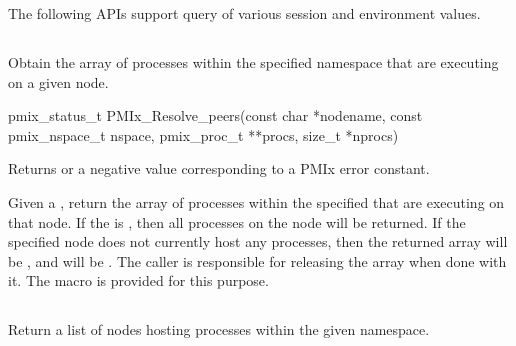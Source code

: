 The following \acp{API} support query of various session and environment values.

\subsection{}

\summary

Obtain the array of processes within the specified namespace that are executing on a given node.

\format

\cspecificstart
\begin{codepar}
pmix_status_t
PMIx_Resolve_peers(const char *nodename,
                   const pmix_nspace_t nspace,
                   pmix_proc_t **procs, size_t *nprocs)
\end{codepar}
\cspecificend

\begin{arglist}
\end{arglist}

Returns  or a negative value corresponding to a PMIx error constant.

\descr

Given a , return the array of processes within the specified 
that are executing on that node.
If the  is , then all processes on the node will be returned.
If the specified node does not currently host any processes, then the returned array will be , and  will be .
The caller is responsible for releasing the  array when done with it.
The  macro is provided for this purpose.

\subsection{}

\summary

Return a list of nodes hosting processes within the given namespace.

\format


